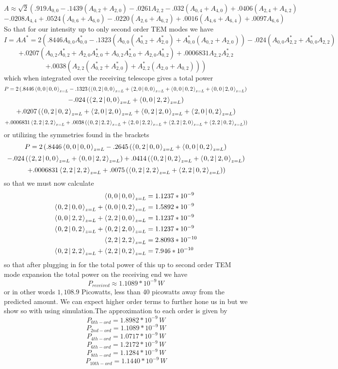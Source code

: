 \documentclass[11pt]{amsart}
\makeatletter
\newcommand{\msp}[1]{\mspace{#1mu}}		%
\newcommand{\0}{\varnothing}		%
\newcommand{\apr}{\approx}		%
\newcommand{\brac}[2]{\left\langle\msp{2} #1\left\lvert \msp{3.5} #2 \right.\right\rangle}	%
\newcommand{\1}{!}
\newcommand{\2}{@}
\newcommand{\3}{\#}
\newcommand{\4}{\$}
\newcommand{\5}{\%}
\newcommand{\6}{$^\wedge$}
\newcommand{\7}{\&}
\newcommand{\8}{*}
\newcommand{\9}{(}
\makeatother
\begin{document}
\[
A \apr \sqrt{2}\left(.919A_{0,0} -.1439\left(A_{0,2}+A_{2,0}\right)-.0261A_{2,2}-.032\left(A_{0,4}+A_{4,0}\right)+.0406\left(A_{2,4}+A_{4,2}\right)\right.
\]
\[
\left. -.0208A_{4,4} + .0524\left(A_{0,6}+A_{6,0}\right)-.0220\left(A_{2,6}+A_{6,2}\right)+.0016\left(A_{4,6}+A_{6,4}\right)+.0097A_{6,6}\right)
\] 
So that for our intensity up to only second order TEM modes we have
\[
I = AA^* = 2\left(.8446A_{0,0}A_{0,0}^*-.1323\left(A_{0,0}\left(A_{0,2}^*+A_{2,0}^*\right)+A_{0,0}^*\left(A_{0,2}+A_{2,0}\right)\right)-.024\left(A_{0,0}A_{2,2}^*+A_{0,0}^*A_{2,2}\right)\right.
\]
\[
\left.+.0207\left(A_{0,2}A_{0,2}^*+A_{2,0}A_{2,0}^*+A_{0,2}A_{2,0}^*+A_{2,0}A_{0,2}^*\right)+.0006831A_{2,2}A_{2,2}^*\right.
\]
\[
\left.+.0038\left(A_{2,2}\left(A_{0,2}^*+A_{2,0}^*\right)+A_{2,2}^*\left(A_{2,0}+A_{0,2}\right)\right)\right)
\]
which when integrated over the receiving telescope gives a total power 
\[
P = 2\left(.8446\brac{0,0}{0,0}_{z=L}-.1323\left(\brac{0,2}{0,0}_{z=L}+\brac{2,0}{0,0}_{z=L}+\brac{0,0}{0,2}_{z=L}+\brac{0,0}{2,0}_{z=L}\right)\right.
\]
\[
\left.-.024\left(\brac{2,2}{0,0}_{z=L}+\brac{0,0}{2,2}_{z=L}\right)\right.
\]
\[
\left.+.0207\left(\brac{0,2}{0,2}_{z=L}+\brac{2,0}{2,0}_{z=L}+\brac{0,2}{2,0}_{z=L}+\brac{2,0}{0,2}_{z=L}\right)\right.
\]
\[
\left.+.0006831\brac{2,2}{2,2}_{z=L}+.0038\left(\brac{0,2}{2,2}_{z=L}+\brac{2,0}{2,2}_{z=L}+\brac{2,2}{2,0}_{z=L}+\brac{2,2}{0,2}_{z=L}\right)\right)
\]
or utilizing the symmetries found in the brackets
\[
P=2\left(.8446\brac{0,0}{0,0}_{z=L}-.2645\left(\brac{0,2}{0,0}_{z=L}+\brac{0,0}{0,2}_{z=L}\right)\right.
\]
\[
\left.-.024\left(\brac{2,2}{0,0}_{z=L}+\brac{0,0}{2,2}_{z=L}\right)+.0414\left(\brac{0,2}{0,2}_{z=L}+\brac{0,2}{2,0}_{z=L}\right)\right.
\]
\[
\left. +.0006831\brac{2,2}{2,2}_{z=L}+.0075\left(\brac{0,2}{2,2}_{z=L}+\brac{2,2}{0,2}_{z=L}\right)\right)
\]
so that we must now calculate
\begin{align*}
\brac{0,0}{0,0}_{z=L} &= 1.1237*10^{-9}
\\
\brac{0,2}{0,0}_{z=L} +\brac{0,0}{0,2}_{z=L}  &= 1.5892*10^{-9}
\\
\brac{0,0}{2,2}_{z=L} +\brac{2,2}{0,0}_{z=L}  & = 1.1237*10^{-9}
\\
\brac{0,2}{0,2}_{z=L} +\brac{0,2}{2,0}_{z=L}  &= 1.1237*10^{-9}
\\
\brac{2,2}{2,2}_{z=L}  &= 2.8093*10^{-10}
\\
\brac{0,2}{2,2}_{z=L} +\brac{2,2}{0,2}_{z=L}  &= 7.946*10^{-10}
\end{align*}
so that after plugging in for the total power of this up to second order TEM mode expansion the total power on the receiving end we have
\[
P_{received} \apr 1.1089*10^{-9}\,W
\]
or in other words $1,108.9$ Picowatts, less than 40 picowatts away from the predicted amount. We can expect higher order terms to further hone us in but we show so with using simulation.The approximation to each order is given by
\[
P_{0th-ord} = 1.8982*10^{-9}\,W
\]
\[
P_{2nd-ord} = 1.1089*10^{-9}\,W
\]
\[
P_{4th-ord} = 1.0717*10^{-9}\,W
\]
\[
P_{6th-ord} = 1.2172*10^{-9}\,W
\]
\[
P_{8th-ord}= 1.1284*10^{-9}\,W
\]
\[
P_{10th-ord} = 1.1440*10^{-9}\,W
\]
\newpage
\end{document}
